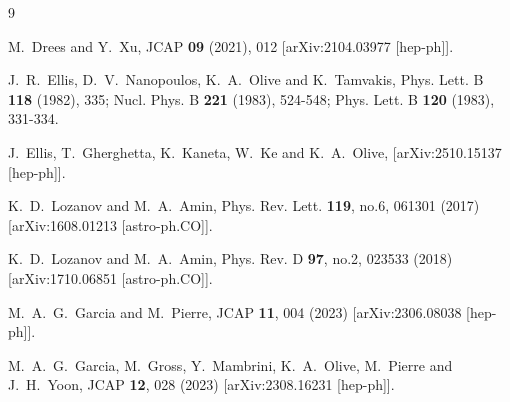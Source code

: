 \documentclass[aps,prev,twocolumn,preprintnumbers,floatfix,nofootinbib]{revtex4-1}
\begin{document}
\begin{thebibliography}{9}
  




M.~Drees and Y.~Xu,
JCAP \textbf{09} (2021), 012
[arXiv:2104.03977 [hep-ph]].

J.~R.~Ellis, D.~V.~Nanopoulos, K.~A.~Olive and K.~Tamvakis,
Phys. Lett. B \textbf{118} (1982), 335;
Nucl. Phys. B \textbf{221} (1983), 524-548;
Phys. Lett. B \textbf{120} (1983), 331-334.%

J.~Ellis, T.~Gherghetta, K.~Kaneta, W.~Ke and K.~A.~Olive,
[arXiv:2510.15137 [hep-ph]].


K.~D.~Lozanov and M.~A.~Amin,
Phys. Rev. Lett. \textbf{119}, no.6, 061301 (2017)
[arXiv:1608.01213 [astro-ph.CO]].

K.~D.~Lozanov and M.~A.~Amin,
Phys. Rev. D \textbf{97}, no.2, 023533 (2018)
[arXiv:1710.06851 [astro-ph.CO]].

M.~A.~G.~Garcia and M.~Pierre,
JCAP \textbf{11}, 004 (2023)
[arXiv:2306.08038 [hep-ph]].

M.~A.~G.~Garcia, M.~Gross, Y.~Mambrini, K.~A.~Olive, M.~Pierre and J.~H.~Yoon,
JCAP \textbf{12}, 028 (2023)
[arXiv:2308.16231 [hep-ph]].



\end{thebibliography}
\end{document}
